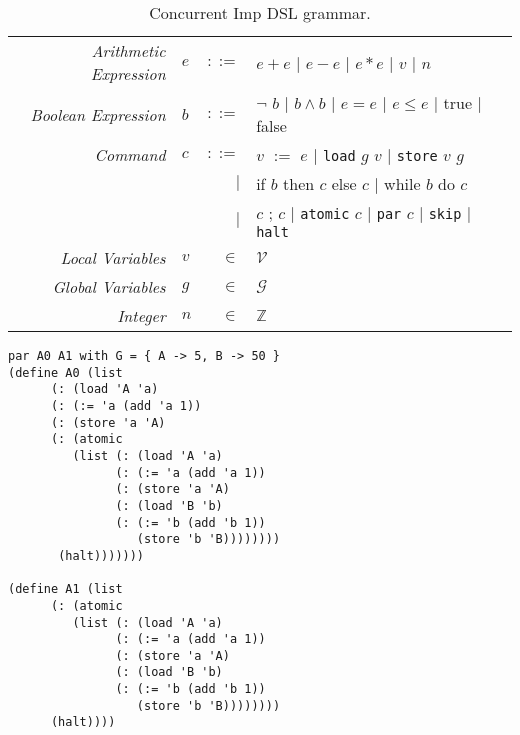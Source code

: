 \begin{table*}[!htbp]
\centering
\begin{tabular}{ r l r l }
\emph{Arithmetic Expression} & $e$ & $::=$ & $e + e$ 
                                         $|$ $e - e$ 
                                         $|$ $e * e$ 
                                         $|$ $v$ 
                                         $|$ $n$ \\
\emph{Boolean Expression} & $b$ & $::=$ & $\neg$ $b$ 
                                      $|$ $b \wedge b$ 
                                      $|$ $e = e$ 
                                      $|$ $e \leq e$ 
                                      $|$ true 
                                      $|$ false \\
\emph{Command} & $c$ & $::=$ & $v$ $:=$ $e$ 
							 $|$   \texttt{load} $g$ $v$
							 $|$   \texttt{store} $v$ $g$ \\ 
               &     &       $|$ & if $b$ then $c$ else $c$
                             $|$   while $b$ do $c$ \\
               &     &       $|$ & $c$ ; $c$
							 $|$   \texttt{atomic} $c$
							 $|$   \texttt{par} $c$
							 $|$   \texttt{skip}
							 $|$   \texttt{halt} 
                               \\
\emph{Local Variables} & $v$ & $\in$ & $\mathcal{V}$ \\
\emph{Global Variables} & $g$ & $\in$ & $\mathcal{G}$ \\
\emph{Integer} & $n$ & $\in$ & $\mathbb{Z}$ \\
\end{tabular}
\caption{
Concurrent Imp DSL grammar. 
}
\label{tab:dsl}
\end{table*}

\begin{lstlisting}[caption={Two threads concurrently updating a global store (\texttt{conimp}).},captionpos=b,frame=single]
par A0 A1 with G = { A -> 5, B -> 50 }  
(define A0 (list
      (: (load 'A 'a)
      (: (:= 'a (add 'a 1))
      (: (store 'a 'A)
      (: (atomic
         (list (: (load 'A 'a)
               (: (:= 'a (add 'a 1))
               (: (store 'a 'A)
               (: (load 'B 'b)
               (: (:= 'b (add 'b 1))
                  (store 'b 'B))))))))
       (halt)))))))

(define A1 (list
      (: (atomic
         (list (: (load 'A 'a)
               (: (:= 'a (add 'a 1))
               (: (store 'a 'A)
               (: (load 'B 'b)
               (: (:= 'b (add 'b 1))
                  (store 'b 'B))))))))
      (halt))))
  
\end{lstlisting}

